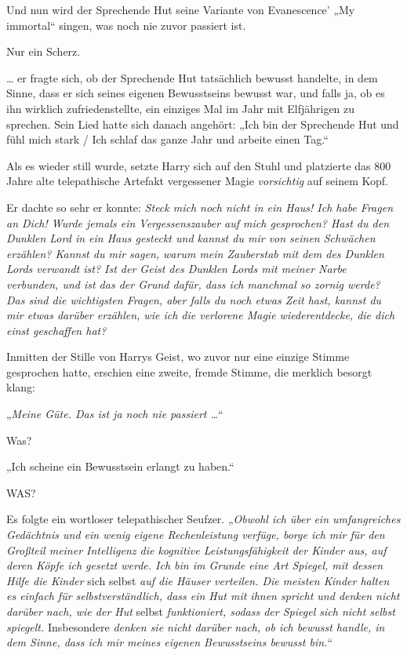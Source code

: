 

\hypertarget{selbstbewusstsein-teil-2}{%

Und nun wird der Sprechende Hut seine Variante von Evanescence' „My immortal“ singen, was noch nie zuvor passiert ist.

Nur ein Scherz.

\later

… er fragte sich, ob der Sprechende Hut tatsächlich bewusst handelte, in dem Sinne, dass er sich seines eigenen Bewusstseins bewusst war, und falls ja, ob es ihn wirklich zufriedenstellte, ein einziges Mal im Jahr mit Elfjährigen zu sprechen. Sein Lied hatte sich danach angehört: „Ich bin der Sprechende Hut und fühl mich stark / Ich schlaf das ganze Jahr und arbeite einen Tag.“

Als es wieder still wurde, setzte Harry sich auf den Stuhl und platzierte das 800 Jahre alte telepathische Artefakt vergessener Magie \emph{vorsichtig} auf seinem Kopf.

Er dachte so sehr er konnte: \emph{Steck mich noch nicht in ein Haus! Ich habe Fragen an Dich! Wurde jemals ein Vergessenszauber auf mich gesprochen? Hast du den Dunklen Lord in ein Haus gesteckt und kannst du mir von seinen Schwächen erzählen? Kannst du mir sagen, warum mein Zauberstab mit dem des Dunklen Lords verwandt ist? Ist der Geist des Dunklen Lords mit meiner Narbe verbunden, und ist das der Grund dafür, dass ich manchmal so zornig werde? Das sind die wichtigsten Fragen, aber falls du noch etwas Zeit hast, kannst du mir etwas darüber erzählen, wie ich die verlorene Magie wiederentdecke, die dich einst geschaffen hat?}

Inmitten der Stille von Harrys Geist, wo zuvor nur eine einzige Stimme gesprochen hatte, erschien eine zweite, fremde Stimme, die merklich besorgt klang:

„\emph{Meine Güte. Das ist ja noch nie passiert …}“

Was?

„Ich scheine ein Bewusstsein erlangt zu haben.“

WAS?

Es folgte ein wortloser telepathischer Seufzer. „\emph{Obwohl ich über ein umfangreiches Gedächtnis und ein wenig eigene Rechenleistung verfüge, borge ich mir für den Großteil meiner Intelligenz die kognitive Leistungsfähigkeit der Kinder aus, auf deren Köpfe ich gesetzt werde. Ich bin im Grunde eine Art Spiegel, mit dessen Hilfe die Kinder} sich selbst \emph{auf die Häuser verteilen. Die meisten Kinder halten es einfach für selbstverständlich, dass ein Hut mit ihnen spricht und denken nicht darüber nach, wie der Hut} selbst \emph{funktioniert, sodass der Spiegel sich nicht selbst spiegelt.} Insbesondere \emph{denken sie nicht darüber nach, ob ich bewusst handle, in dem Sinne, dass ich mir meines eigenen Bewusstseins bewusst bin.}“

}
